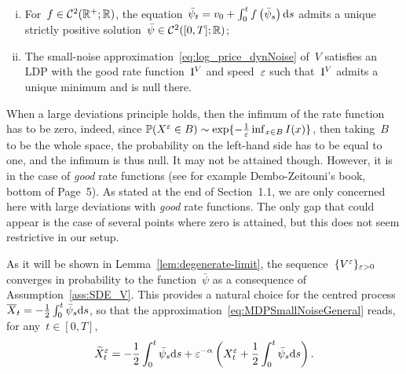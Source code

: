 \begin{assumption}\label{ass:SDE_V}\ 
\begin{enumerate}[i)]
    \item For~$f\in \mathcal{C}^2(\mathbb{R}^{+}; \mathbb{R})$, 
    the equation~$\bar\psi_t = v_0 + \int_0^t f\left(\bar\psi_s\right)\mathrm{d} s$ admits a unique strictly positive solution~$\bar\psi\in\mathcal{C}^2([0,T]; \mathbb{R})$;
    \item The small-noise approximation~\eqref{eq:log_price_dynNoise} of~$V$ satisfies an LDP with the good rate function~$\mathrm{I}^{V}$ and speed~$\varepsilon$ such that~$\mathrm{I}^{V}$ admits a unique minimum and is null there.
\end{enumerate}
\end{assumption}
\begin{remark}
When a large deviations principle holds,
then the infimum of the rate function has to be zero, indeed, since 
$\mathbb{P}(X^\varepsilon \in B)\sim \exp\{-\frac{1}{\varepsilon}\inf_{x\in B} I(x)\}$,
then taking~$B$ to be the whole space,  
the probability on the left-hand side has to be equal to one, and the infimum is thus null. 
It may not be attained though. 
However, it is in the case of \emph{good} rate functions (see for example Dembo-Zeitouni's book, bottom of Page~5). 
As stated at the end of Section~1.1, we are only concerned here with large deviations with \emph{good} rate functions.
The only gap that could appear is the case of several points where zero is attained,
but this does not seem restrictive in our setup.
\end{remark}
As it will be shown in Lemma~\ref{lem:degenerate-limit}, 
the sequence~$\{V^\varepsilon\}_{\varepsilon>0}$ converges in probability to the function~$\bar\psi$ as a consequence of Assumption~\ref{ass:SDE_V}. 
This provides a natural choice for the centred process 
${\overline{X}_t = -\frac{1}{2}\int_0^t\bar\psi_s\mathrm{d} s}$,
so that the approximation~\eqref{eq:MDPSmallNoiseGeneral}
reads, for any~$t\in [0,T]$,
\begin{equation}\label{eq:MDPSmallNoiseX}
\widetilde{X}^\varepsilon_t = -\frac{1}{2} \int_0^t\bar\psi_s \mathrm{d} s + \varepsilon^{-\alpha}\left(X^{\varepsilon}_t + \frac{1}{2} \int_0^t\bar\psi_s \mathrm{d} s\right).
\end{equation}

